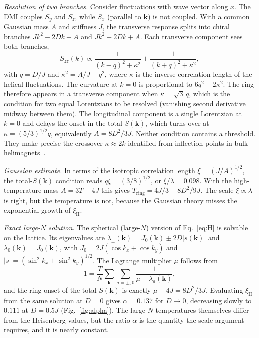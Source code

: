 \documentclass[prb,reprint,longbibliography,superscriptaddress,amsmath,amssymb]{revtex4-2}
\newcommand{\Tr}{T_{\mathrm{ring}}}
\newcommand{\xiH}{\xi_{\mathrm{H}}}
\newcommand{\kv}{\mathbf{k}}
\begin{document}
\textit{Resolution of two branches.} Consider fluctuations with wave vector along $x$. The DMI couples $S_y$ and $S_z$, while $S_x$ (parallel to $\kv$) is not coupled. With a common Gaussian mass $A$ and stiffness $J$, the transverse response splits into chiral branches $Jk^2-2Dk+A$ and $Jk^2+2Dk+A$. Each transverse component sees both branches,
\begin{equation}
S_{zz}(k)\propto\frac{1}{(k-q)^2+\kappa^2}+\frac{1}{(k+q)^2+\kappa^2},
\label{eq:lor}
\end{equation}
with $q=D/J$ and $\kappa^2=A/J-q^2$, where $\kappa$ is the inverse correlation length of the helical fluctuations. The curvature at $k=0$ is proportional to $6q^2-2\kappa^2$. The ring therefore appears in a transverse component when $\kappa=\sqrt3\,q$, which is the condition for two equal Lorentzians to be resolved (vanishing second derivative midway between them). The longitudinal component is a single Lorentzian at $k=0$ and delays the onset in the total $S(\kv)$, which turns over at $\kappa=(5/3)^{1/2}q$, equivalently $A=8D^2/3J$. Neither condition contains a threshold. They make precise the crossover $\kappa\approx2k$ identified from inflection points in bulk helimagnets~\cite{Grigoriev2011}.

\textit{Gaussian estimate.} In terms of the isotropic correlation length $\xi=(J/A)^{1/2}$, the total-$S(\kv)$ condition reads $q\xi=(3/8)^{1/2}$, or $\xi/\lambda=0.098$. With the high-temperature mass $A=3T-4J$ this gives $\Tr=4J/3+8D^2/9J$. The scale $\xi\propto\lambda$ is right, but the temperature is not, because the Gaussian theory misses the exponential growth of $\xiH$.

\textit{Exact large-$N$ solution.} The spherical (large-$N$) version of Eq.~\eqref{eq:H} is solvable on the lattice. Its eigenvalues are $\lambda_\pm(\kv)=J_0(\kv)\pm2D|s(\kv)|$ and $\lambda_0(\kv)=J_0(\kv)$, with $J_0=2J(\cos k_x+\cos k_y)$ and $|s|=(\sin^2k_x+\sin^2k_y)^{1/2}$. The Lagrange multiplier $\mu$ follows from
\begin{equation}
1=\frac{T}{N}\sum_{\kv}\sum_{a=\pm,0}\frac{1}{\mu-\lambda_a(\kv)},
\label{eq:largeN}
\end{equation}
and the ring onset of the total $S(\kv)$ is exactly $\mu-4J=8D^2/3J$. Evaluating $\xiH$ from the same solution at $D=0$ gives $\alpha=0.137$ for $D\to0$, decreasing slowly to $0.111$ at $D=0.5J$ (Fig.~\ref{fig:alpha}). The large-$N$ temperatures themselves differ from the Heisenberg values, but the ratio $\alpha$ is the quantity the scale argument requires, and it is nearly constant.
\end{document}
